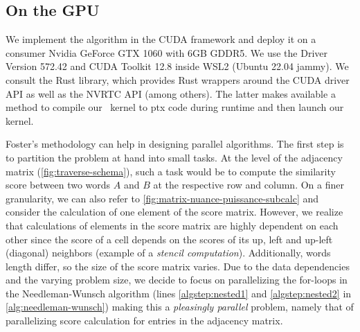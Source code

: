 \subsection{On the GPU}

We implement the algorithm in the CUDA framework and deploy it on a consumer Nvidia GeForce GTX 1060 with 6GB GDDR5. We use the Driver Version 572.42 and CUDA Toolkit 12.8 inside WSL2 (Ubuntu 22.04 jammy). We consult the  Rust library, which provides Rust wrappers around the CUDA driver API as well as the NVRTC API (among others). The latter makes available a method to compile our \Cpp~kernel to \gls{ptx} code during runtime and then launch our kernel.


Foster's methodology can help in designing parallel algorithms. The first step is to partition the problem at hand into small tasks. At the level of the adjacency matrix (\autoref{fig:traverse-schema}), such a task would be to compute the similarity score between two words $A$ and $B$ at the respective row and column. On a finer granularity, we can also refer to \autoref{fig:matrix-nuance-puissance-subcalc} and consider the calculation of one element of the score matrix. However, we realize that calculations of elements in the score matrix are highly dependent on each other since the score of a cell depends on the scores of its up, left and up-left (diagonal) neighbors (example of a \textit{stencil computation}). Additionally, words length differ, so the size of the score matrix varies. Due to the data dependencies and the varying problem size, we decide to focus on parallelizing the for-loops in the Needleman-Wunsch algorithm (lines \ref{algstep:nested1} and \ref{algstep:nested2} in \autoref{alg:needleman-wunsch}) making this a \textit{pleasingly parallel} problem, namely that of parallelizing score calculation for entries in the adjacency matrix.


